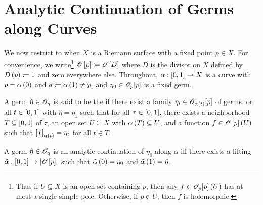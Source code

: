 \documentclass[../Moduli_Spaces_of_Riemann_Surfaces.tex]{subfiles}
\begin{document}
    \section{Analytic Continuation of Germs along Curves}
    We now restrict to when $X$ is a Riemann surface with a fixed point $p\in X$. For convenience, we write\footnote{Thus if $U\subseteq X$ is an open set containing $p$, then any $f\in\mathscr{O}_p\!\left[p\right]\left(U\right)$ has at most a single simple pole. Otherwise, if $p\not\in U$, then $f$ is holomorphic.} $\mathscr{O}\left[p\right]\coloneqq\mathscr{O}\left[D\right]$ where $D$ is the divisor on $X$ defined by $D\left(p\right)\coloneqq1$ and zero everywhere else. Throughout, $\alpha:\left[0,1\right]\to X$ is a curve with $p=\alpha\left(0\right)$ and $q\coloneqq\alpha\left(1\right)\neq p$, and $\eta_0\in\mathscr{O}_p\!\left[p\right]$ is a fixed germ.
    \begin{definition}
        A germ $\hat{\eta}\in\mathscr{O}_q$ is said to be the  if there exist a family $\eta_t\in\mathscr{O}_{\alpha\left(t\right)}\!\left[p\right]$ of germs for all $t\in\left[0,1\right]$ with $\hat{\eta}=\eta_1$ such that for all $\tau\in\left[0,1\right]$, there exists a neighborhood $T\subseteq\left[0,1\right]$ of $\tau$, an open set $U\subseteq X$ with $\alpha\left(T\right)\subseteq U$, and a function $f\in\mathscr{O}\left[p\right]\left(U\right)$ such that $\left[f\right]_{\alpha\left(t\right)}=\eta_t$ for all $t\in T$.
    \end{definition}
    \begin{proposition}\label{CS:prp:analytic_continuation_iff_lifting}
        A germ $\hat{\eta}\in\mathscr{O}_q$ is an analytic continuation of $\eta_0$ along $\alpha$ iff there exists a lifting $\tilde{\alpha}:\left[0,1\right]\to\left|\mathscr{O}\left[p\right]\right|$ such that $\tilde{\alpha}\left(0\right)=\eta_0$ and $\tilde{\alpha}\left(1\right)=\hat{\eta}$.
    \end{proposition}
\end{document}
